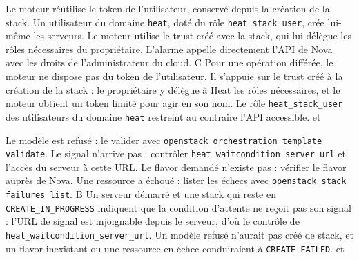   {Le moteur réutilise le token de l'utilisateur, conservé depuis la création de la stack.}
  {Un utilisateur du domaine \texttt{heat}, doté du rôle \texttt{heat\_stack\_user}, crée lui-même les serveurs.}
  {Le moteur utilise le trust créé avec la stack, qui lui délègue les rôles nécessaires du propriétaire.}
  {L'alarme appelle directement l'API de Nova avec les droits de l'administrateur du cloud.}
  {C}
  {Pour une opération différée, le moteur ne dispose pas du token de l'utilisateur. Il s'appuie sur le trust créé à la création de la stack : le propriétaire y délègue à Heat les rôles nécessaires, et le moteur obtient un token limité pour agir en son nom. Le rôle \texttt{heat\_stack\_user} des utilisateurs du domaine \texttt{heat} restreint au contraire l'API accessible.}
  { et }

  {Le modèle est refusé : le valider avec \texttt{openstack orchestration template validate}.}
  {Le signal n'arrive pas : contrôler \texttt{heat\_waitcondition\_server\_url} et l'accès du serveur à cette URL.}
  {Le flavor demandé n'existe pas : vérifier le flavor auprès de Nova.}
  {Une ressource a échoué : lister les échecs avec \texttt{openstack stack failures list}.}
  {B}
  {Un serveur démarré et une stack qui reste en \texttt{CREATE\_IN\_PROGRESS} indiquent que la condition d'attente ne reçoit pas son signal : l'URL de signal est injoignable depuis le serveur, d'où le contrôle de \texttt{heat\_waitcondition\_server\_url}. Un modèle refusé n'aurait pas créé de stack, et un flavor inexistant ou une ressource en échec conduiraient à \texttt{CREATE\_FAILED}.}
  { et }

